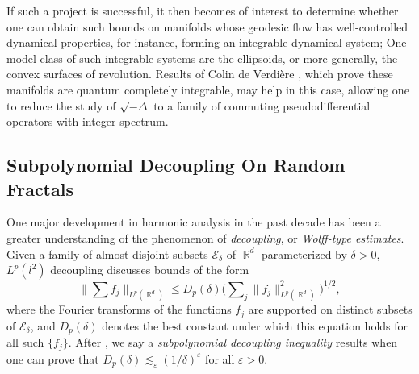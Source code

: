 \documentclass[11pt]{article}
\DeclareMathOperator{\RR}{\mathbb{R}}
\begin{document}
If such a project is successful, it then becomes of interest to determine whether one can obtain such bounds on manifolds whose geodesic flow has well-controlled dynamical properties, for instance, forming an integrable dynamical system; One model class of such integrable systems are the ellipsoids, or more generally, the convex surfaces of revolution. Results of Colin de Verdière \cite{VerdiereIntegrable}, which prove these manifolds are quantum completely integrable, may help in this case, allowing one to reduce the study of $\sqrt{-\Delta}$ to a family of commuting pseudodifferential operators with integer spectrum.

%
%

\subsection{Subpolynomial Decoupling On Random Fractals}

One major development in harmonic analysis in the past decade has been a greater understanding of the phenomenon of \emph{decoupling}, or \emph{Wolff-type estimates}. Given a family of almost disjoint subsets $\mathcal{E}_\delta$ of $\RR^d$ parameterized by $\delta > 0$, $L^p(l^2)$ decoupling discusses bounds of the form
%
\[ \Big\| \sum f_j \Big\|_{L^p(\RR^d)} \leq D_p(\delta) \Big( \sum\nolimits_j \| f_j \|_{L^p(\RR^d)}^2 \Big)^{1/2}, \]
%
where the Fourier transforms of the functions $f_j$ are supported on distinct subsets of $\mathcal{E}_\delta$, and $D_p(\delta)$ denotes the best constant under which this equation holds for all such $\{ f_j \}$. After \cite{DemeterBook}, we say a \emph{subpolynomial decoupling inequality} results when one can prove that $D_p(\delta) \lesssim_\varepsilon (1/\delta)^{\varepsilon}$ for all $\varepsilon > 0$.%
\end{document}
